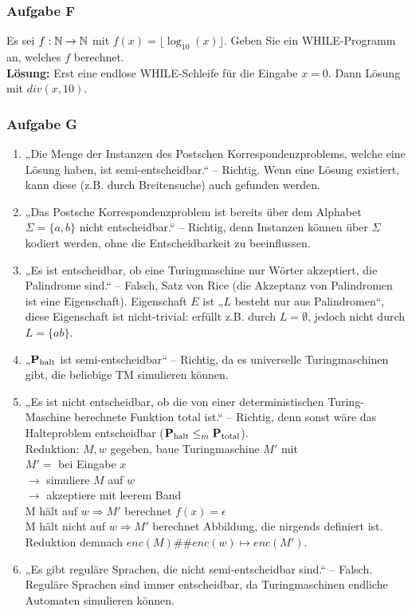 \subsubsection*{Aufgabe F}
    Es sei $f:\mathbb{N}\to\mathbb{N}$ mit $f(x)=\lfloor\log_{10}(x)\rfloor$. Geben Sie ein WHILE-Programm an, welches $f$ berechnet. \\
    \textbf{Lösung:} Erst eine endlose WHILE-Schleife für die Eingabe $x=0$. Dann Lösung mit $div(x, 10)$.

\subsubsection*{Aufgabe G}
    \begin{enumerate}
        \item „Die Menge der Instanzen des Postschen Korrespondenzproblems, welche eine Lösung haben, ist semi-entscheidbar.“ – Richtig. Wenn eine Lösung existiert, kann diese (z.B. durch Breitensuche) auch gefunden werden.

        \item „Das Postsche Korrespondenzproblem ist bereits über dem Alphabet $\Sigma = \{a,b\}$ nicht entscheidbar.“ – Richtig, denn Instanzen können über $\Sigma$ kodiert werden, ohne die Entscheidbarkeit zu beeinflussen.

        \item „Es ist entscheidbar, ob eine Turingmaschine nur Wörter akzeptiert, die Palindrome sind.“ – Falsch, Satz von Rice (die Akzeptanz von Palindromen ist eine \f{Eigenschaft}). Eigenschaft $E$ ist „$L$ besteht nur aus Palindromen“, diese Eigenschaft ist nicht-trivial: erfüllt z.B. durch $L = \emptyset$, jedoch nicht durch $L = \{ab\}$.

        \item „$\textbf{P}_{\text{halt}}$ ist semi-entscheidbar“ – Richtig, da es universelle Turingmaschinen gibt, die beliebige TM simulieren können.

        \item „Es ist nicht entscheidbar, ob die von einer deterministischen Turing-Maschine berechnete Funktion total ist.“ – Richtig, denn sonst wäre das Halteproblem entscheidbar ($\textbf{P}_{\text{halt}} \leq_{m} \textbf{P}_{\text{total}}$). \\
        Reduktion: $M, w$ gegeben, baue Turingmaschine $M'$ mit \\
        $M' =$ bei Eingabe $x$ \\
        $\to$ simuliere $M$ auf $w$ \\
        $\to$ akzeptiere mit leerem Band \\
        M hält auf $w \Rightarrow M'$ berechnet $f(x)= \epsilon$ \\
        M hält nicht auf $w \Rightarrow M'$ berechnet Abbildung, die nirgends definiert ist. \\
        Reduktion demnach $enc(M)\#\#enc(w) \mapsto enc(M')$.

        \item „Es gibt reguläre Sprachen, die nicht semi-entscheidbar sind.“ – Falsch. Reguläre Sprachen sind immer entscheidbar, da Turingmaschinen endliche Automaten simulieren können.
    \end{enumerate}

